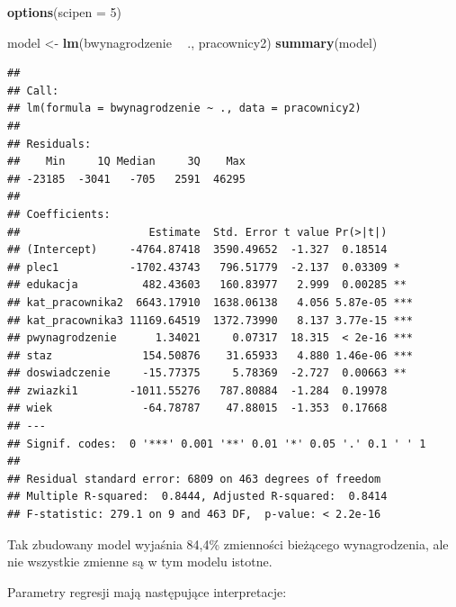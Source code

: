 \documentclass[
]{book}
\newenvironment{Shaded}{\begin{snugshade}}{\end{snugshade}}
\newcommand{\DataTypeTok}[1]{\textcolor[rgb]{0.13,0.29,0.53}{#1}}
\newcommand{\DecValTok}[1]{\textcolor[rgb]{0.00,0.00,0.81}{#1}}
\newcommand{\KeywordTok}[1]{\textcolor[rgb]{0.13,0.29,0.53}{\textbf{#1}}}
\newcommand{\NormalTok}[1]{#1}
\newcommand{\OperatorTok}[1]{\textcolor[rgb]{0.81,0.36,0.00}{\textbf{#1}}}
\newcommand{\StringTok}[1]{\textcolor[rgb]{0.31,0.60,0.02}{#1}}
\begin{document}
\begin{Shaded}
\begin{Highlighting}[]
\KeywordTok{options}\NormalTok{(}\DataTypeTok{scipen =} \DecValTok{5}\NormalTok{)}

\NormalTok{model <-}\StringTok{ }\KeywordTok{lm}\NormalTok{(bwynagrodzenie }\OperatorTok{~}\StringTok{ }\NormalTok{., pracownicy2)}
\KeywordTok{summary}\NormalTok{(model)}
\end{Highlighting}
\end{Shaded}

\begin{verbatim}
## 
## Call:
## lm(formula = bwynagrodzenie ~ ., data = pracownicy2)
## 
## Residuals:
##    Min     1Q Median     3Q    Max 
## -23185  -3041   -705   2591  46295 
## 
## Coefficients:
##                    Estimate  Std. Error t value Pr(>|t|)    
## (Intercept)     -4764.87418  3590.49652  -1.327  0.18514    
## plec1           -1702.43743   796.51779  -2.137  0.03309 *  
## edukacja          482.43603   160.83977   2.999  0.00285 ** 
## kat_pracownika2  6643.17910  1638.06138   4.056 5.87e-05 ***
## kat_pracownika3 11169.64519  1372.73990   8.137 3.77e-15 ***
## pwynagrodzenie      1.34021     0.07317  18.315  < 2e-16 ***
## staz              154.50876    31.65933   4.880 1.46e-06 ***
## doswiadczenie     -15.77375     5.78369  -2.727  0.00663 ** 
## zwiazki1        -1011.55276   787.80884  -1.284  0.19978    
## wiek              -64.78787    47.88015  -1.353  0.17668    
## ---
## Signif. codes:  0 '***' 0.001 '**' 0.01 '*' 0.05 '.' 0.1 ' ' 1
## 
## Residual standard error: 6809 on 463 degrees of freedom
## Multiple R-squared:  0.8444, Adjusted R-squared:  0.8414 
## F-statistic: 279.1 on 9 and 463 DF,  p-value: < 2.2e-16
\end{verbatim}

Tak zbudowany model wyjaśnia 84,4\% zmienności bieżącego wynagrodzenia, ale nie wszystkie zmienne są w tym modelu istotne.

Parametry regresji mają następujące interpretacje:
\end{document}
